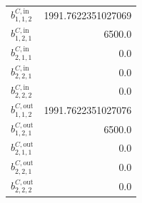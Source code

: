 \documentclass{article}%
\begin{document}
\begin{multicols*}{3}
\begin{supertabular}{lr}
	$b_{1,1,2}^{C,\text{in}}$ & 1991.7622351027069 \\%
	$b_{1,2,1}^{C,\text{in}}$ & 6500.0 \\%
	$b_{2,1,1}^{C,\text{in}}$ & 0.0 \\%
	$b_{2,2,1}^{C,\text{in}}$ & 0.0 \\%
	$b_{2,2,2}^{C,\text{in}}$ & 0.0 \\%
	$b_{1,1,2}^{C,\text{out}}$ & 1991.7622351027076 \\%
	$b_{1,2,1}^{C,\text{out}}$ & 6500.0 \\%
	$b_{2,1,1}^{C,\text{out}}$ & 0.0 \\%
	$b_{2,2,1}^{C,\text{out}}$ & 0.0 \\%
	$b_{2,2,2}^{C,\text{out}}$ & 0.0 \\%
\end{supertabular}%
\end{multicols*}%
\end{document}
